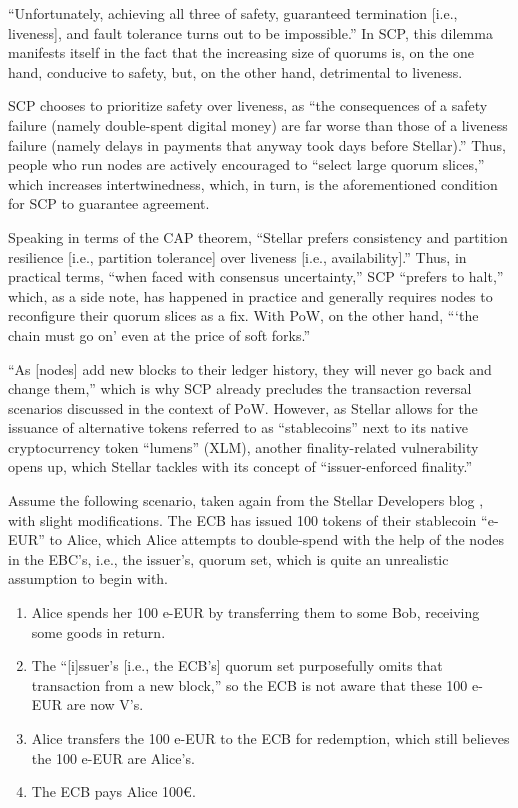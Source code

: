 ``Unfortunately, achieving all three of safety, guaranteed termination [i.e., liveness], and fault tolerance turns out to be impossible.'' \autocite{mazieres2019safetyvsliveness}
In SCP, this dilemma manifests itself in the fact that the increasing size of quorums is, on the one hand, conducive to safety, but, on the other hand, detrimental to liveness. \autocite{mazieres2019safetyvsliveness}

SCP chooses to prioritize safety over liveness, as ``the consequences of a safety failure (namely double-spent digital money) are far worse than those of a liveness failure (namely delays in payments that anyway took days before Stellar).''
Thus, people who run nodes are actively encouraged to ``select large quorum slices,'' which increases intertwinedness, which, in turn, is the aforementioned condition for SCP to guarantee agreement.

Speaking in terms of the CAP theorem, ``Stellar prefers consistency and partition resilience [i.e., partition tolerance] over liveness [i.e., availability].'' \autocite{stellar2019networkhalt}
Thus, in practical terms, ``when faced with consensus uncertainty,'' SCP ``prefers to halt,'' which, as a side note, has happened in practice and generally requires nodes to reconfigure their quorum slices as a fix. \autocite{stellar2019networkhalt}
With PoW, on the other hand, \enquote{\enquote{the chain must go on} even at the price of soft forks.} \autocite{stellar2019networkhalt}

``As [nodes] add new blocks to their ledger history, they will never go back and change them,'' which is why SCP already precludes the transaction reversal scenarios discussed in the context of PoW.
However, as Stellar allows for the issuance of alternative tokens referred to as ``stablecoins'' next to its native cryptocurrency token ``lumens'' (XLM), another finality-related vulnerability opens up, which Stellar tackles with its concept of ``issuer-enforced finality.''

Assume the following scenario, taken again from the Stellar Developers blog \autocite{stellar2020ief}, with slight modifications.
The ECB has issued 100 tokens of their stablecoin ``e-EUR'' to Alice, which Alice attempts to double-spend with the help of the nodes in the EBC's, i.e., the issuer's, quorum set, which is quite an unrealistic assumption to begin with.

\begin{enumerate}
	\item
		Alice spends her 100 e-EUR by transferring them to some Bob, receiving some goods in return.
	\item
		The ``[i]ssuer’s [i.e., the ECB's] quorum set purposefully omits that transaction from a new block,'' so the ECB is not aware that these 100 e-EUR are now V's.
	\item
		Alice transfers the 100 e-EUR to the ECB for redemption, which still believes the 100 e-EUR are Alice's.
	\item
		The ECB pays Alice 100€.
\end{enumerate}

